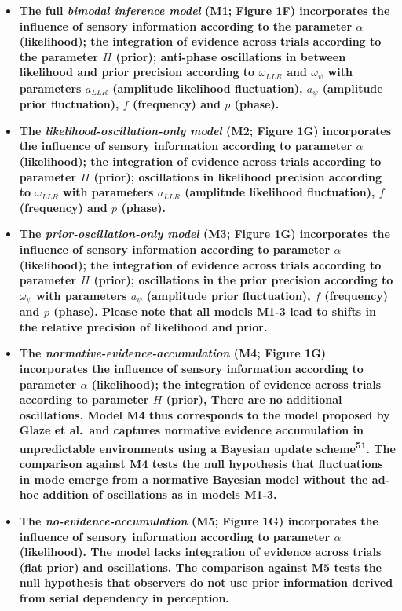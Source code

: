 \documentclass[
]{article}
\begin{document}
\begin{itemize}
\item
  \textbf{The full \emph{bimodal inference model} (M1; Figure 1F)
  incorporates the influence of sensory information according to the
  parameter \(\alpha\) (likelihood); the integration of evidence across
  trials according to the parameter \(H\) (prior); anti-phase
  oscillations in between likelihood and prior precision according to
  \(\omega_{LLR}\) and \(\omega_{\psi}\) with parameters \(a_{LLR}\)
  (amplitude likelihood fluctuation), \(a_{\psi}\) (amplitude prior
  fluctuation), \(f\) (frequency) and \(p\) (phase).}
\item
  \textbf{The \emph{likelihood-oscillation-only model} (M2; Figure 1G)
  incorporates the influence of sensory information according to
  parameter \(\alpha\) (likelihood); the integration of evidence across
  trials according to parameter \(H\) (prior); oscillations in
  likelihood precision according to \(\omega_{LLR}\) with parameters
  \(a_{LLR}\) (amplitude likelihood fluctuation), \(f\) (frequency) and
  \(p\) (phase).}
\item
  \textbf{The \emph{prior-oscillation-only model} (M3; Figure 1G)
  incorporates the influence of sensory information according to
  parameter \(\alpha\) (likelihood); the integration of evidence across
  trials according to parameter \(H\) (prior); oscillations in the prior
  precision according to \(\omega_{\psi}\) with parameters \(a_{\psi}\)
  (amplitude prior fluctuation), \(f\) (frequency) and \(p\) (phase).
  Please note that all models M1-3 lead to shifts in the relative
  precision of likelihood and prior.}
\item
  \textbf{The \emph{normative-evidence-accumulation} (M4; Figure 1G)
  incorporates the influence of sensory information according to
  parameter \(\alpha\) (likelihood); the integration of evidence across
  trials according to parameter \(H\) (prior), There are no additional
  oscillations. Model M4 thus corresponds to the model proposed by Glaze
  et al.~and captures normative evidence accumulation in unpredictable
  environments using a Bayesian update scheme\textsuperscript{51}. The
  comparison against M4 tests the null hypothesis that fluctuations in
  mode emerge from a normative Bayesian model without the ad-hoc
  addition of oscillations as in models M1-3.}
\item
  \textbf{The \emph{no-evidence-accumulation} (M5; Figure 1G)
  incorporates the influence of sensory information according to
  parameter \(\alpha\) (likelihood). The model lacks integration of
  evidence across trials (flat prior) and oscillations. The comparison
  against M5 tests the null hypothesis that observers do not use prior
  information derived from serial dependency in perception.}
\end{itemize}
\end{document}
